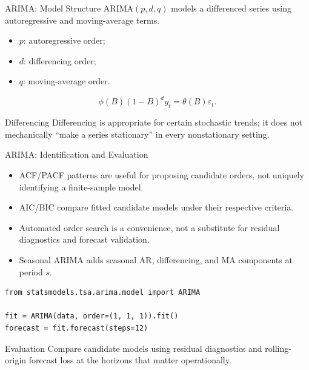 \begin{frame}{ARIMA: Model Structure}
ARIMA$(p,d,q)$ models a differenced series using autoregressive and moving-average terms.

\begin{itemize}
  \item $p$: autoregressive order;
  \item $d$: differencing order;
  \item $q$: moving-average order.
\end{itemize}

\[
  \phi(B)(1-B)^d y_t = \theta(B)\varepsilon_t.
\]

\begin{alertblock}{Differencing}
Differencing is appropriate for certain stochastic trends; it does not mechanically ``make a series stationary'' in every nonstationary setting.
\end{alertblock}
\end{frame}

\begin{frame}[fragile]{ARIMA: Identification and Evaluation}
\begin{itemize}
  \item ACF/PACF patterns are useful for proposing candidate orders, not uniquely identifying a finite-sample model.
  \item AIC/BIC compare fitted candidate models under their respective criteria.
  \item Automated order search is a convenience, not a substitute for residual diagnostics and forecast validation.
  \item Seasonal ARIMA adds seasonal AR, differencing, and MA components at period $s$.
\end{itemize}

\begin{lstlisting}[style=code,basicstyle=\ttfamily\small]
from statsmodels.tsa.arima.model import ARIMA

fit = ARIMA(data, order=(1, 1, 1)).fit()
forecast = fit.forecast(steps=12)
\end{lstlisting}

\begin{block}{Evaluation}
Compare candidate models using residual diagnostics and rolling-origin forecast loss at the horizons that matter operationally.
\end{block}
\end{frame}

